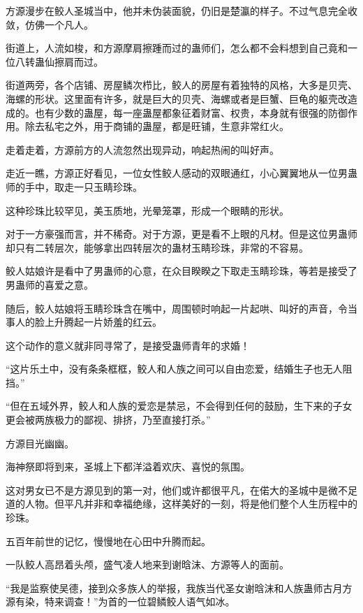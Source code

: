
\begin{this_body}

方源漫步在鲛人圣城当中，他并未伪装面貌，仍旧是楚瀛的样子。不过气息完全收敛，仿佛一个凡人。

街道上，人流如梭，和方源摩肩擦踵而过的蛊师们，怎么都不会料想到自己竟和一位八转蛊仙擦肩而过。

街道两旁，各个店铺、房屋鳞次栉比，鲛人的房屋有着独特的风格，大多是贝壳、海螺的形状。这里面有许多，就是巨大的贝壳、海螺或者是巨蟹、巨龟的躯壳改造成的。也有少数的蛊屋，每一座蛊屋都象征着财富、权贵，本身就有很强的防御作用。除去私宅之外，用于商铺的蛊屋，都是旺铺，生意非常红火。

走着走着，方源前方的人流忽然出现异动，响起热闹的叫好声。

走近一瞧，方源正好看见，一位女性鲛人感动的双眼通红，小心翼翼地从一位男蛊师的手中，取走一只玉睛珍珠。

这种珍珠比较罕见，美玉质地，光晕笼罩，形成一个眼睛的形状。

对于一方豪强而言，并不稀奇。对于方源，更是看不上眼的凡材。但是这位男蛊师却只有二转层次，能够拿出四转层次的蛊材玉睛珍珠，非常的不容易。

鲛人姑娘许是看中了男蛊师的心意，在众目睽睽之下取走玉睛珍珠，等若是接受了男蛊师的喜爱之意。

随后，鲛人姑娘将玉睛珍珠含在嘴中，周围顿时响起一片起哄、叫好的声音，令当事人的脸上升腾起一片娇羞的红云。

这个动作的意义就非同寻常了，是接受蛊师青年的求婚！

“这片乐土中，没有条条框框，鲛人和人族之间可以自由恋爱，结婚生子也无人阻挡。”

“但在五域外界，鲛人和人族的爱恋是禁忌，不会得到任何的鼓励，生下来的子女更会被两族极力的鄙视、排挤，乃至直接打杀。”

方源目光幽幽。

海神祭即将到来，圣城上下都洋溢着欢庆、喜悦的氛围。

这对男女已不是方源见到的第一对，他们或许都很平凡，在偌大的圣城中是微不足道的人物。但平凡并非和幸福绝缘，这样美好的一刻，将是他们整个人生历程中的珍珠。

五百年前世的记忆，慢慢地在心田中升腾而起。

一队鲛人高昂着头颅，盛气凌人地来到谢晗沫、方源等人的面前。

“我是监察使吴德，接到众多族人的举报，我族当代圣女谢晗沫和人族蛊师古月方源有染，特来调查！”为首的一位碧鳞鲛人语气如冰。


\end{this_body}
